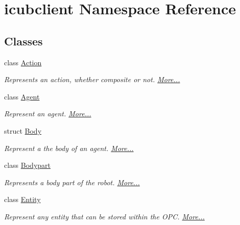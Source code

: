 \hypertarget{namespaceicubclient}{}\section{icubclient Namespace Reference}
\label{namespaceicubclient}
\subsection*{Classes}
\begin{DoxyCompactItemize}
\item 
class \hyperlink{group__icubclient__representations_classicubclient_1_1Action}{Action}
\begin{DoxyCompactList}\small\item\em Represents an action, whether composite or not.  \hyperlink{group__icubclient__representations_classicubclient_1_1Action}{More...}\end{DoxyCompactList}\item 
class \hyperlink{group__icubclient__representations_classicubclient_1_1Agent}{Agent}
\begin{DoxyCompactList}\small\item\em Represent an agent.  \hyperlink{group__icubclient__representations_classicubclient_1_1Agent}{More...}\end{DoxyCompactList}\item 
struct \hyperlink{group__icubclient__representations_structicubclient_1_1Body}{Body}
\begin{DoxyCompactList}\small\item\em Represent a the body of an agent.  \hyperlink{group__icubclient__representations_structicubclient_1_1Body}{More...}\end{DoxyCompactList}\item 
class \hyperlink{group__icubclient__representations_classicubclient_1_1Bodypart}{Bodypart}
\begin{DoxyCompactList}\small\item\em Represents a body part of the robot.  \hyperlink{group__icubclient__representations_classicubclient_1_1Bodypart}{More...}\end{DoxyCompactList}\item 
class \hyperlink{group__icubclient__representations_classicubclient_1_1Entity}{Entity}
\begin{DoxyCompactList}\small\item\em Represent any entity that can be stored within the O\+PC.  \hyperlink{group__icubclient__representations_classicubclient_1_1Entity}{More...}\end{DoxyCompactList}\item 

\end{DoxyCompactItemize}
